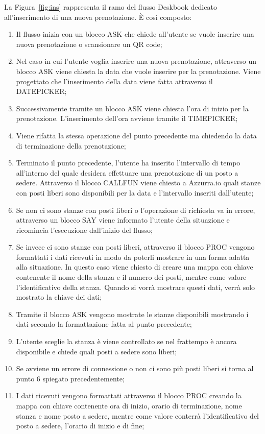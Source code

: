 La Figura~\ref{fig:ins} rappresenta il ramo del flusso Deskbook dedicato all'inserimento di una nuova prenotazione. È così composto:
\begin{enumerate}
	\item Il flusso inizia con un blocco ASK che chiede all'utente se vuole inserire una nuova prenotazione o scansionare un \gls{QR code}\ap{[g]};
	\item Nel caso in cui l'utente voglia inserire una nuova prenotazione, attraverso un blocco ASK viene chiesta la data che vuole inserire per la prenotazione. Viene progettato che l'inserimento della data viene fatta attraverso il DATEPICKER;
	\item Successivamente tramite un blocco ASK viene chiesta l'ora di inizio per la prenotazione. L'inserimento dell'ora avviene tramite il TIMEPICKER;
	\item Viene rifatta la stessa operazione del punto precedente ma chiedendo la data di terminazione della prenotazione;
	\item Terminato il punto precedente, l'utente ha inserito l'intervallo di tempo all'interno del quale desidera effettuare una prenotazione di un posto a sedere. Attraverso il blocco CALLFUN viene chiesto a Azzurra.io quali stanze con posti liberi sono disponibili per la data e l'intervallo inseriti dall'utente;
	\item Se non ci sono stanze con posti liberi o l'operazione di richiesta va in errore, attraverso un blocco SAY viene informato l'utente della situazione e ricomincia l'esecuzione dall'inizio del flusso;
	\item Se invece ci sono stanze con posti liberi, attraverso il blocco PROC vengono formattati i dati ricevuti in modo da poterli mostrare in una forma adatta alla situazione. In questo caso viene chiesto di creare una mappa con chiave contenente il nome della stanza e il numero dei posti, mentre come valore l'identificativo della stanza. Quando si vorrà mostrare questi dati, verrà solo mostrato la chiave dei dati;
	\item Tramite il blocco ASK vengono mostrate le stanze disponibili mostrando i dati secondo la formattazione fatta al punto precedente;
	\item L'utente sceglie la stanza è viene controllato se nel frattempo è ancora disponibile e chiede quali posti a sedere sono liberi;
	\item Se avviene un errore di connessione o non ci sono più posti liberi si torna al punto 6 spiegato precedentemente;
	\item I dati ricevuti vengono formattati attraverso il blocco PROC creando la mappa con chiave contenente ora di inizio, orario di terminazione, nome stanza e nome posto a sedere, mentre come valore conterrà l'identificativo del posto a sedere, l'orario di inizio e di fine;

\end{enumerate}
